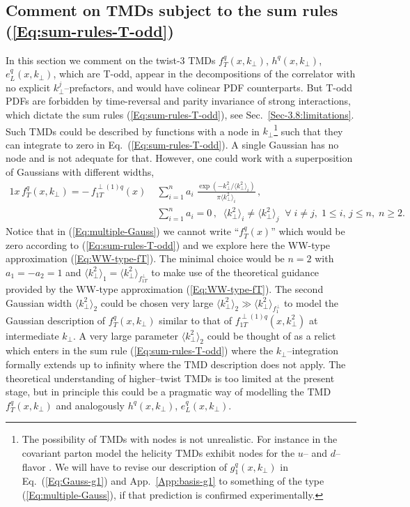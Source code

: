 \documentclass[a4paper,11pt]{article}
\newcommand{\la}{\langle}
\newcommand{\ra}{\rangle}
\def\kperp{k_\perp}
\begin{document}
\newpage
\subsection{Comment on TMDs subject to the sum rules (\ref{Eq:sum-rules-T-odd})}
\label{App-B:comment-Todd-twist-3}

In this section we comment on the twist-3 TMDs 
$f_T^q(x,\kperp)$,  $h^q(x,\kperp)$, $e_L^q(x,\kperp)$,  
which are T-odd, appear in the decompositions of the correlator with no 
explicit $k_\perp^j$--prefactors, and would have colinear PDF counterparts. 
But T-odd PDFs are forbidden by time-reversal and parity invariance of 
strong interactions, which dictate the sum rules (\ref{Eq:sum-rules-T-odd}), 
see Sec.~\ref{Sec-3.8:limitations}. 
Such TMDs could be described by functions with a node in 
$k_\perp$\footnote{The possibility of TMDs with nodes is not unrealistic.
	For instance in the covariant parton model the helicity TMDs 
	exhibit nodes for the $u$-- and $d$--flavor \cite{Efremov:2010mt}.
	We will have to revise our description of $g_1^q(x,\kperp)$ 
	in Eq.~(\ref{Eq:Gauss-g1}) and App.~\ref{App:basis-g1} to something 
	of the type (\ref{Eq:multiple-Gauss}), if that prediction is 
	confirmed experimentally. }
such that they can integrate to zero in Eq.~(\ref{Eq:sum-rules-T-odd}).
A single Gaussian has no node and is not adequate for that.
However, one could work with a superposition of Gaussians
with different widths, 
\begin{alignat}{1}
	x \, f_T^q(x,\kperp) =  - \, f_{1T}^{\perp (1)q}(x)\;
	&\sum\limits_{i=1}^{n} a_i\;
	\frac{\exp(-\kperp^2/\la\kperp^2\ra_i^{ })}{\pi\la\kperp^2\ra_i^{ }}\,,
	\label{Eq:multiple-Gauss}\\
	&\sum\limits_{i=1}^n a_i = 0\,, \;\;
	\la\kperp^2\ra_i^{ }\neq\la\kperp^2\ra_j^{ }\;\;\forall\;i\neq j,
	\; 1\le i,\,j\le n,\;n\ge 2.\nonumber
\end{alignat}
Notice that in (\ref{Eq:multiple-Gauss}) we cannot write ``$f_T^q(x)$'' 
which would be zero according to (\ref{Eq:sum-rules-T-odd}) and we
explore here the WW-type approximation (\ref{Eq:WW-type-fT}). 
The minimal choice would be $n=2$ with $a_1=-a_2=1$ and
$\la\kperp^2\ra_1^{ } = \la\kperp^2\ra_{f_{1T}^\perp}$ to make use 
of the theoretical guidance provided by the WW-type approximation 
(\ref{Eq:WW-type-fT}). 
The second Gaussian width $\la\kperp^2\ra_2^{ }$ could be chosen
very large $\la\kperp^2\ra_2^{ } \gg \la\kperp^2\ra_{f_1^\perp}$ to
model the Gaussian description of $f_T^{q}(x,\kperp)$ similar to 
that of $f_{1T}^{\perp(1)q}(x,\kperp^2)$ at intermediate $\kperp$.
A very large parameter $\la\kperp^2\ra_2^{ }$ could be thought of as
a relict which enters in the sum rule (\ref{Eq:sum-rules-T-odd}) 
where the $\kperp$--integration formally extends up to infinity 
where the TMD description does not apply. The theoretical
understanding of higher--twist TMDs is too limited at
the present stage, but in principle this could be a 
pragmatic way of modelling the TMD $f_T^q(x,\kperp)$
and analogously $h^q(x,\kperp)$, $e_L^q(x,\kperp)$.
\end{document}
